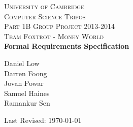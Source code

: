 \begin{titlepage}
\begin{center}

\textsc{\LARGE University of Cambridge}\\[3.5cm]

\textsc{\Large Computer Science Tripos \\[2mm] Part 1B Group Project 2013-2014}\\[0.4cm]
\textsc{\Large Team Foxtrot - Money World}\\[2cm]

{\huge \bfseries \vspace{3.5mm} Formal Requirements Specification}\\[2cm]

\begin{center}
\large
Daniel Low\\
Darren Foong\\
Jovan Powar\\
Samuel Haines\\
Ramankur Sen\\
\end{center}

\vfill

{\large Last Revised: \today}
\end{center}
\end{titlepage}
